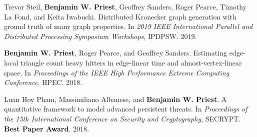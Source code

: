 \item Trevor Steil, \textbf{Benjamin W. Priest}, Geoffrey Sanders, Roger Pearce, Timothy La Fond, and Keita Iwabuchi.
	Distributed Kronecker graph generation with ground truth of many graph properties.
	In \emph{2019 IEEE International Parallel and Distributed Processing Symposium Workshops}, 
	IPDPSW. 
	2019.

\item \textbf{Benjamin W. Priest}, Roger Pearce, and Geoffrey Sanders.
	Estimating edge-local triangle count heavy hitters in edge-linear time and almost-vertex-linear space.
	In \emph{Proceedings of the IEEE High Performance Extreme Computing Conference}, 
	HPEC. 
	2018.

\item Luan Hoy Pham, Massimiliano Albanese, and \textbf{Benjamin W. Priest}.
	A quantitative framework to model advanced persistent threats.
	In \emph{Proceedings of the 15th International Conference on Security and Cryptography}, 
	SECRYPT. 
	\textbf{Best Paper Award}.
	2018.
